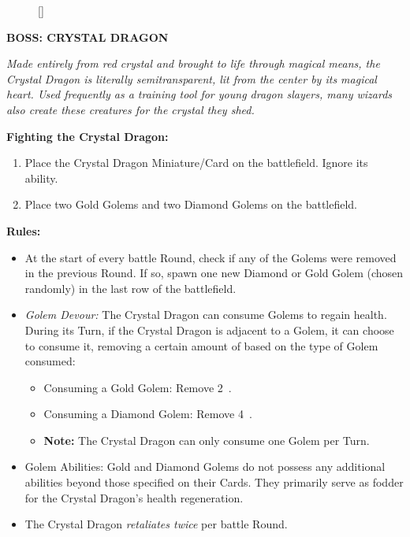 \begin{figure}
  \raisebox{0pt}[\dimexpr{}\baselineskip\relax]{}
  \vspace*{\baselineskip}
\end{figure}
{
  \textbf{\MakeUppercase{Boss: Crystal Dragon}}

  \medskip

  \textit{Made entirely from red crystal and brought to life through magical means, the Crystal Dragon is literally semitransparent, lit from the center by its magical heart.
    Used frequently as a training tool for young dragon slayers, many wizards also create these creatures for the crystal they shed.
  }

  \medskip

  \textbf{Fighting the Crystal Dragon:}
  \begin{enumerate}
    \item Place the Crystal Dragon Miniature/Card on the battlefield.
      Ignore its ability.
    \item Place two Gold Golems and two Diamond Golems on the battlefield.
  \end{enumerate}

  \medskip

  \textbf{Rules:}
  \begin{itemize}
    \item At the start of every battle Round, check if any of the Golems were removed in the previous Round.
      If so, spawn one new Diamond or Gold Golem (chosen randomly) in the last row of the battlefield.
    \item \textit{Golem Devour:} The Crystal Dragon can consume Golems to regain health.
      During its Turn, if the Crystal Dragon is adjacent to a Golem, it can choose to consume it, removing a certain amount of  based on the type of Golem consumed:
      \begin{itemize}
        \item Consuming a Gold Golem: Remove 2~.
        \item Consuming a Diamond Golem: Remove 4~.
        \item[] \textbf{Note:} The Crystal Dragon can only consume one Golem per Turn.
      \end{itemize}
    \item Golem Abilities: Gold and Diamond Golems do not possess any additional abilities beyond those specified on their Cards.
      They primarily serve as fodder for the Crystal Dragon's health regeneration.
    \item The Crystal Dragon \textit{retaliates twice} per battle Round.
  \end{itemize}
}

